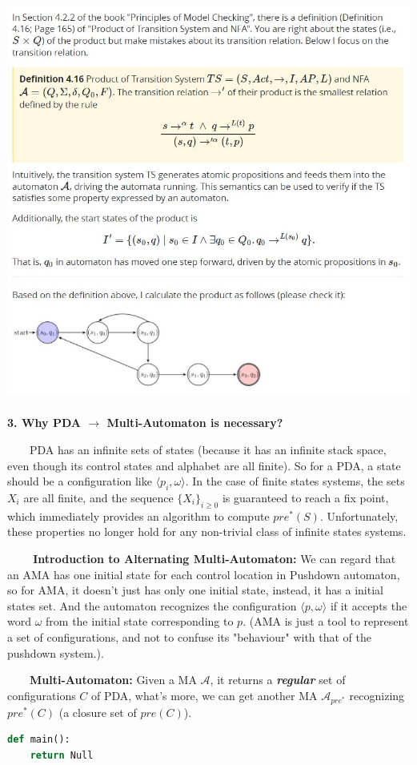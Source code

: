 \documentclass{sciposter}
\begin{document}
\begin{multicols}{3}
    \includegraphics{figures/1-1-answer.jpg}~\\[1cm]


    \textbf{3. Why PDA $\rightarrow$ Multi-Automaton is necessary?}

    ~~~~PDA has an infinite sets of states (because it has an infinite stack space, even though its control states and alphabet are all finite). So for a PDA, a state should be a configuration like $\langle p_i,\omega \rangle$. In the case of finite states systems, the sets $X_i$ are all finite, and the sequence $\{X_i\}_{i\geq 0}$ is guaranteed to reach a fix point, which immediately provides an algorithm to compute $pre^*(S)$. Unfortunately, these properties no longer hold for any non-trivial class of infinite states systems.

    \textbf{~~~~Introduction to Alternating Multi-Automaton:} We can regard that an AMA has one initial state for each control location in Pushdown automaton, so for AMA, it doesn't just has only one initial state, instead, it has a initial states set. And the automaton recognizes the configuration $\langle p,\omega\rangle$ if it accepts the word $\omega$ from the initial state corresponding to $p$. (AMA is just a tool to represent a set of configurations, and not to confuse its "behaviour" with that of the pushdown system.)\cite{BouajjaniEM97}.


    ~~~~\textbf{Multi-Automaton:} Given a MA $\mathcal{A}$, it returns a \emph{\textbf{regular}} set of configurations $C$ of PDA, what's more, we can get another MA $\mathcal{A}_{pre^*}$ recognizing $pre^*(C)$ (a closure set of $pre(C)$).

\begin{lstlisting}[language=Python]
def main():
	return Null
\end{lstlisting}


\end{multicols}



\end{document}
